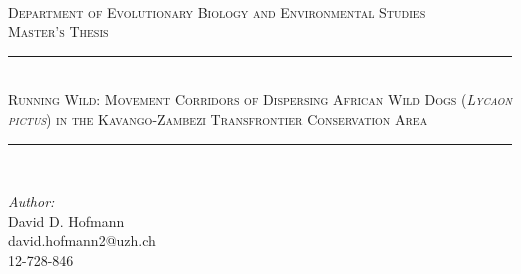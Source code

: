 \documentclass[abstract=on,10pt,a4paper,bibliography=totocnumbered]{scrartcl}
\begin{document}


\begin{titlepage}

\newcommand{\HRule}{\rule{\linewidth}{0.5mm}}

\center


\textsc{\LARGE  }\\[1.5cm]

\textsc{\Large Department of Evolutionary Biology and Environmental
Studies}\\[0.5cm]

\textsc{\large Master's Thesis}\\[0.5cm]

\doublespacing
\HRule \\[0.4cm]

{\textsc{ \LARGE Running Wild: Movement Corridors of Dispersing African Wild
Dogs (\textit{Lycaon pictus}) in the Kavango-Zambezi Transfrontier Conservation
Area}}\\[0.4cm]

\HRule \\[1.5cm]
\singlespacing


\begin{minipage}{0.4\textwidth}
\begin{flushleft} \large

\emph{Author:}\\
David D. Hofmann\\
david.hofmann2@uzh.ch\\
12-728-846

\end{flushleft}
\end{minipage}
~
\begin{minipage}{0.4\textwidth}
\begin{flushright} \large


\end{flushright}
\end{minipage}
\end{titlepage}
\end{document}
